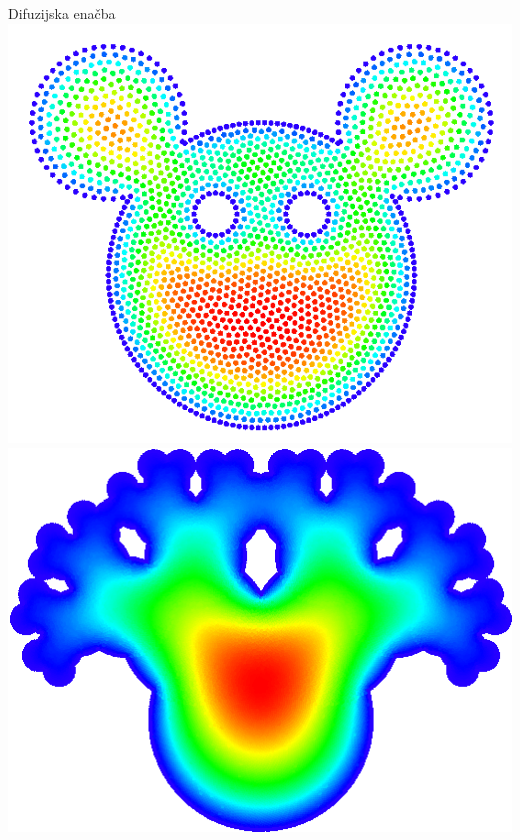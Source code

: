 \begin{frame}{Difuzijska enačba}
  \vspace{1ex}
  \includegraphics[height=0.4\textheight]{resources/miki.png}
  \hspace{-10pt}
  \includegraphics[height=0.4\textheight]{resources/poisson_weird1.png}
  \hspace{0pt}

\end{frame}
